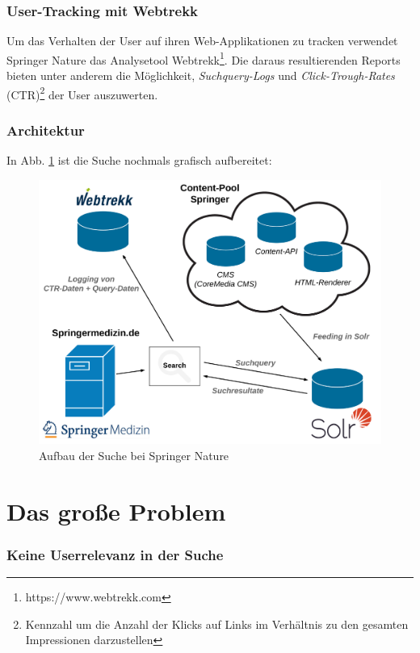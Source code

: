 \subsubsection{User-Tracking mit Webtrekk}
\label{sec:Einfuehrung:AufbauSucheBeiSpringerNature:Webtrekk}

Um das Verhalten der User auf ihren Web-Applikationen zu tracken verwendet Springer Nature das Analysetool Webtrekk\footnote{https://www.webtrekk.com}. Die daraus resultierenden Reports bieten unter anderem die Möglichkeit, \textit{Suchquery-Logs} und \textit{Click-Trough-Rates} (CTR)\footnote{Kennzahl um die Anzahl der Klicks auf Links im Verhältnis zu den gesamten Impressionen darzustellen} der User auszuwerten.

\pagebreak

\subsubsection{Architektur}
\label{sec:Einfuehrung:AufbauSucheBeiSpringerNature:Architektur}

In Abb. \ref{fig:SucheSpringerNature} ist die Suche nochmals grafisch aufbereitet:

\begin{figure}[H]
\centering
\includegraphics[width=0.5\linewidth]{gfx/AufbauSucheSpringerNature}
\caption[Aufbau der Suche bei Springer Nature]{Aufbau der Suche bei Springer Nature}
\label{fig:SucheSpringerNature}
\end{figure}

\section{Das große Problem}
\label{sec:Einfuehrung:Problemstellung}

\subsubsection{Keine Userrelevanz in der Suche}
\label{sec:Einfuehrung:Problemstellung:Userrelevanz}

